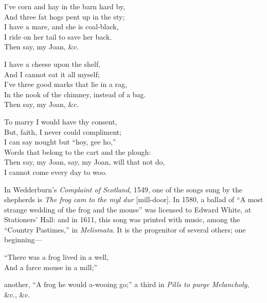 \bigskip




\settowidth{\versewidth}{In the nook of the chimney, instead of a bag.}
\begin{dcverse}I’ve corn and hay in the barn hard by,\\
And three fat hogs pent up in the sty;\\
I have a mare, and she is coal-black,\\
I ride on her tail to save her back.\\
\hspace{6em}Then say, my Joan, \&c.

I have a cheese upon the shelf,\\
And I cannot eat it all myself;\\
I’ve three good marks that lie in a rag,\\
In the nook of the chimney, instead of a bag.\\
\hspace{6em}Then say, my Joan, \&c.
\end{dcverse}

\begin{scverse}To marry I would have thy consent,\\
But, faith, I never could compliment;\\
I can say nought but “hoy, gee ho,”\\
Words that belong to the cart and the plough:\\
\hspace{6em}Then say, my Joan, say, my Joan, will that not do,\\
\hspace{6em}I cannot come every day to woo.
\end{scverse}

\pagebreak


In Wedderburn’s \textit{Complaint of Scotland}, 1549, one of the songs sung by the
shepherds is \textit{The frog cam to the myl dur} [mill-door]. In 1580, a ballad of
“A most strange wedding of the frog and the mouse” was licensed to Edward
White, at Stationers’ Hall: and in 1611, this song was printed with music, among
the “Country Pastimes,” in \textit{Melismata}. It is the progenitor of several others;
one beginning—
\settowidth{\versewidth}{“There was a frog lived in a well,}
\begin{scverse}
“There was a frog lived in a well,\\
And a farce mouse in a mill;”
\end{scverse}
another, “A frog he would a-wooing go;” a third in \textit{Pills to purge Melancholy}, \&c., \&c.


